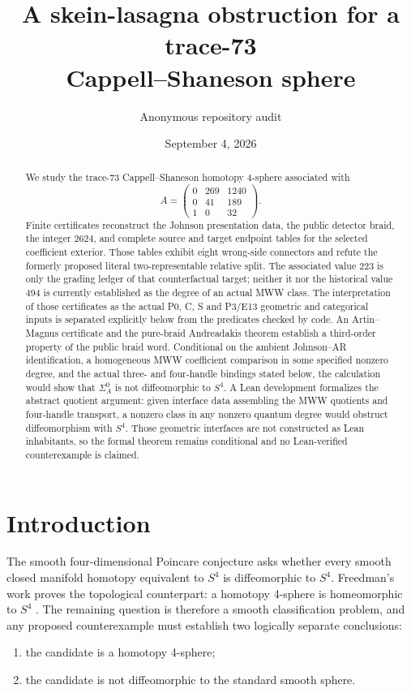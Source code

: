 \documentclass[11pt]{amsart}
\title[A trace-73 obstruction]
{A skein-lasagna obstruction for a trace-73\\
Cappell--Shaneson sphere}
\author{Anonymous repository audit}
\date{September 4, 2026}
\theoremstyle{definition}
\theoremstyle{remark}
\begin{document}
\begin{abstract}
We study the trace-73 Cappell--Shaneson homotopy $4$-sphere associated with
\[
A=\begin{pmatrix}0&269&1240\\0&41&189\\1&0&32\end{pmatrix}.
\]
Finite certificates reconstruct the Johnson presentation data, the public
detector braid, the integer $2624$, and complete source and target endpoint
tables for the selected coefficient exterior.  Those tables exhibit eight
wrong-side connectors and refute the formerly proposed literal
two-representable relative split.  The associated value $223$ is only the
grading ledger of that counterfactual target; neither it nor the historical
value $494$ is currently established as the degree of an actual MWW class.
The interpretation of those certificates as the actual P0, C, S and P3/E13
geometric and categorical inputs is separated explicitly below from the
predicates checked by code.
An Artin--Magnus certificate and the pure-braid Andreadakis theorem
establish a third-order property of the public braid word.
Conditional on the ambient Johnson--AR identification, a homogeneous MWW
coefficient comparison in some specified nonzero degree, and the actual
three- and four-handle bindings stated below, the
calculation would show that $\Sigma_A^0$ is not diffeomorphic to $S^4$.
A Lean development formalizes the abstract quotient argument: given interface
data assembling the MWW quotients and four-handle transport, a nonzero class
in any nonzero quantum degree would obstruct diffeomorphism with $S^4$.
Those geometric interfaces are not constructed as Lean inhabitants, so the
formal theorem remains conditional and no Lean-verified counterexample is claimed.
\end{abstract}

\maketitle
\tableofcontents

\section{Introduction}

The smooth four-dimensional Poincare conjecture asks whether every smooth
closed manifold homotopy equivalent to $S^4$ is diffeomorphic to $S^4$.
Freedman's work proves the topological counterpart: a homotopy 4-sphere is
homeomorphic to $S^4$ \cite{Freedman1982}.  The remaining question is
therefore a smooth classification problem, and any proposed counterexample
must establish two logically separate conclusions:
\begin{enumerate}
\item the candidate is a homotopy 4-sphere;
\item the candidate is not diffeomorphic to the standard smooth sphere.
\end{enumerate}
\end{document}
